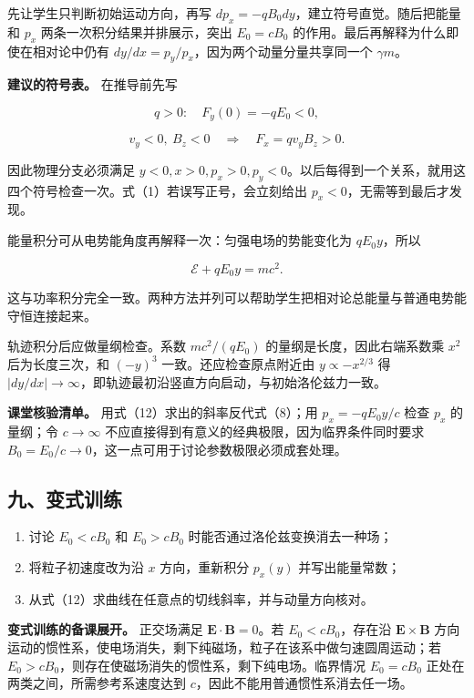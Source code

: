 \documentclass[12pt,a4paper,UTF8]{ctexart}
\newcommand{\tightlist}{\setlength{\itemsep}{0pt}\setlength{\parskip}{0pt}}
\begin{document}
先让学生只判断初始运动方向，再写
\(dp_x=-qB_0dy\)，建立符号直觉。随后把能量和 \(p_x\)
两条一次积分结果并排展示，突出 \(E_0=cB_0\)
的作用。最后再解释为什么即使在相对论中仍有
\(dy/dx=p_y/p_x\)，因为两个动量分量共享同一个 \(\gamma m\)。

\textbf{建议的符号表。} 在推导前先写

\[
q>0:\quad F_y(0)=-qE_0<0,
\]

\[
v_y<0,\ B_z<0\quad\Rightarrow\quad F_x=qv_yB_z>0.
\]

因此物理分支必须满足
\(y<0,x>0,p_x>0,p_y<0\)。以后每得到一个关系，就用这四个符号检查一次。式（1）若误写正号，会立刻给出
\(p_x<0\)，无需等到最后才发现。

能量积分可从电势能角度再解释一次：匀强电场的势能变化为 \(qE_0y\)，所以

\[
\mathcal E+qE_0y=mc^2.
\]

这与功率积分完全一致。两种方法并列可以帮助学生把相对论总能量与普通电势能守恒连接起来。

轨迹积分后应做量纲检查。系数 \(mc^2/(qE_0)\)
的量纲是长度，因此右端系数乘 \(x^2\) 后为长度三次，和 \((-y)^3\)
一致。还应检查原点附近由 \(y\propto-x^{2/3}\) 得
\(|dy/dx|\to\infty\)，即轨迹最初沿竖直方向启动，与初始洛伦兹力一致。

\textbf{课堂核验清单。} 用式（12）求出的斜率反代式（8）；用
\(p_x=-qE_0y/c\) 检查 \(p_x\) 的量纲；令 \(c\to\infty\)
不应直接得到有意义的经典极限，因为临界条件同时要求
\(B_0=E_0/c\to0\)，这一点可用于讨论参数极限必须成套处理。

\subsection{九、变式训练}\label{ux4e5dux53d8ux5f0fux8badux7ec3-5}

\begin{enumerate}
\def\labelenumi{\arabic{enumi}.}
\tightlist
\item
  讨论 \(E_0<cB_0\) 和 \(E_0>cB_0\) 时能否通过洛伦兹变换消去一种场；
\item
  将粒子初速度改为沿 \(x\) 方向，重新积分 \(p_x(y)\) 并写出能量常数；
\item
  从式（12）求曲线在任意点的切线斜率，并与动量方向核对。
\end{enumerate}

\textbf{变式训练的备课展开。} 正交场满足 \(\bm E\cdot\bm B=0\)。若
\(E_0<cB_0\)，存在沿 \(\bm E\times\bm B\)
方向运动的惯性系，使电场消失，剩下纯磁场，粒子在该系中做匀速圆周运动；若
\(E_0>cB_0\)，则存在使磁场消失的惯性系，剩下纯电场。临界情况
\(E_0=cB_0\) 正处在两类之间，所需参考系速度达到
\(c\)，因此不能用普通惯性系消去任一场。
\end{document}
